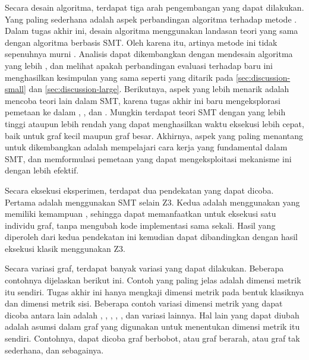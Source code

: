 Secara desain algoritma, terdapat tiga arah pengembangan yang dapat dilakukan. Yang paling sederhana adalah aspek perbandingan algoritma terhadap metode . Dalam tugas akhir ini, desain algoritma  menggunakan landasan teori yang sama dengan algoritma berbasis SMT. Oleh karena itu, artinya metode ini tidak sepenuhnya murni . Analisis dapat dikembangkan dengan mendesain algoritma  yang lebih , dan melihat apakah perbandingan evaluasi terhadap  baru ini menghasilkan kesimpulan yang sama seperti yang ditarik pada \autoref{sec:discussion-small} dan \autoref{sec:discussion-large}. Berikutnya, aspek yang lebih menarik adalah mencoba teori lain dalam SMT, karena tugas akhir ini baru mengeksplorasi pemetaan  ke dalam , , dan . Mungkin terdapat teori SMT dengan  yang lebih tinggi ataupun lebih rendah yang dapat menghasilkan waktu eksekusi lebih cepat, baik untuk graf kecil maupun graf besar. Akhirnya, aspek yang paling menantang untuk dikembangkan adalah mempelajari cara kerja  yang fundamental dalam SMT, dan memformulasi pemetaan yang dapat mengeksploitasi mekanisme ini dengan lebih efektif.

Secara eksekusi eksperimen, terdapat dua pendekatan yang dapat dicoba. Pertama adalah menggunakan  SMT selain Z3. Kedua adalah menggunakan  yang memiliki kemampuan , sehingga dapat memanfaatkan  untuk eksekusi satu individu graf, tanpa mengubah kode implementasi sama sekali. Hasil yang diperoleh dari kedua pendekatan ini kemudian dapat dibandingkan dengan hasil eksekusi klasik menggunakan Z3.

Secara variasi graf, terdapat banyak variasi yang dapat dilakukan. Beberapa contohnya dijelaskan berikut ini. Contoh yang paling jelas adalah dimensi metrik itu sendiri. Tugas akhir ini hanya mengkaji dimensi metrik pada bentuk klasiknya dan dimensi metrik sisi. Beberapa contoh variasi dimensi metrik yang dapat dicoba antara lain adalah , , , , , dan variasi lainnya. Hal lain yang dapat diubah adalah asumsi dalam graf yang digunakan untuk menentukan dimensi metrik itu sendiri. Contohnya, dapat dicoba graf berbobot, atau graf berarah, atau graf tak sederhana, dan sebagainya.

